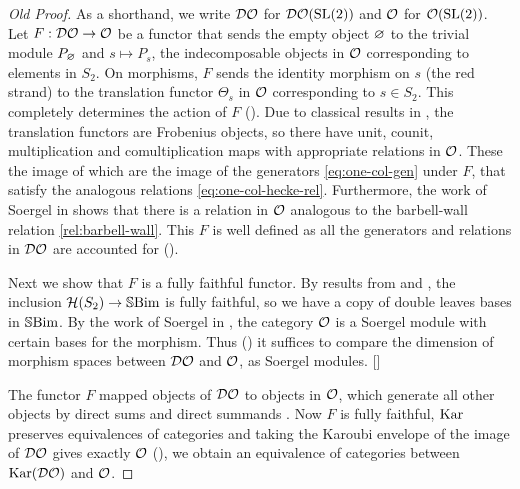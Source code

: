 \begin{proof}[Old Proof]
    As a shorthand, we write $\mathcal{DO}$ for $\mathcal{DO}(\operatorname{SL}(2))$ and $\mathcal{O}$ for $\mathcal{O}(\operatorname{SL}(2))$. Let $F: \mathcal{DO} \to \mathcal{O}$ be a functor that sends the empty object $\varnothing$ to the trivial module $P_\varnothing$ and $s \mapsto P_s$, the indecomposable objects in $\mathcal{O}$ corresponding to elements in $S_2$. On morphisms, $F$ sends the identity morphism on $s$ (the red strand) to the translation functor $\Theta_s$ in $\mathcal{O}$ corresponding to $s \in S_2$. This completely determines the action of $F$ (). Due to classical results in \cite{humphreys-category-O}, the translation functors are Frobenius objects, so there have unit, counit, multiplication and comultiplication maps with appropriate relations in $\mathcal{O}$. These the image of which are the image of the generators \eqref{eq:one-col-gen} under $F$, that satisfy the analogous relations \eqref{eq:one-col-hecke-rel}. Furthermore, the work of Soergel in \cite{soergel-category-O} shows that there is a relation in $\mathcal{O}$ analogous to the barbell-wall relation \eqref{rel:barbell-wall}. This $F$ is well defined as all the generators and relations in $\mathcal{DO}$ are accounted for ().

    Next we show that $F$ is a fully faithful functor. By results from \cite{elias-williamson-soergel-calculus} and \cite{libedinsky-lightleavesbasis}, the inclusion $\mathcal{H}(S_2) \to \operatorname{\mathbb{S}Bim}$ is fully faithful, so we have a copy of double leaves bases in $\operatorname{\mathbb{S}Bim}$. By the work of Soergel in \cite{soergel-category-O}, the category $\mathcal{O}$ is a Soergel module  with certain bases for the morphism. Thus () it suffices to  compare the dimension of morphism spaces between $\mathcal{DO}$ and $\mathcal{O}$, as Soergel modules. []

    The functor $F$ mapped objects of $\mathcal{DO}$ to objects  in $\mathcal{O}$, which generate all other objects by direct sums and direct summands . Now $F$ is fully faithful, $\operatorname{Kar}$ preserves equivalences of categories and taking the Karoubi envelope of the image of $\mathcal{DO}$ gives exactly $\mathcal{O}$ (), we obtain an equivalence of categories between $\operatorname{Kar}(\mathcal{DO})$ and $\mathcal{O}$.
\end{proof}




